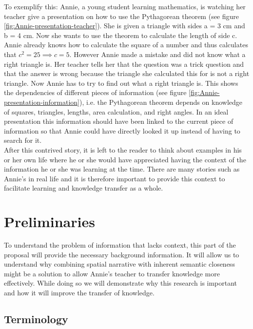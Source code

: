 \documentclass[twoside, 12pt]{article}
\begin{document}
To exemplify this: Annie, a young student learning mathematics, is watching her teacher give a presentation on how to use the Pythagorean theorem (see figure \ref{fig:Annie-presentation-teacher}). She is given a triangle with sides a = 3 cm and b = 4 cm. Now she wants to use the theorem to calculate the length of side c. Annie already knows how to calculate the square of a number and thus calculates that $c^2 = 25 \implies c = 5$. However Annie made a mistake and did not know what a right triangle is. Her teacher tells her that the question was a trick question and that the answer is wrong because the triangle she calculated this for is not a right triangle. Now Annie has to try to find out what a right triangle is. This shows the dependencies of different pieces of information (see figure \ref{fig:Annie-presentation-information}), i.e. the Pythagorean theorem depends on knowledge of squares, triangles, lengths, area calculation, and right angles. In an ideal presentation this information should have been linked to the current piece of information so that Annie could have directly looked it up instead of having to search for it.\\

After this contrived story, it is left to the reader to think about examples in his or her own life where he or she would have appreciated having the context of the information he or she was learning at the time. There are many stories such as Annie's in real life and it is therefore important to provide this context to facilitate learning and knowledge transfer as a whole. \\

\section{Preliminaries}
\label{sec:preliminaries}

To understand the problem of information that lacks context, this part of the proposal will provide the necessary background information. It will allow us to understand why combining spatial narrative with inherent semantic closeness might be a solution to allow Annie's teacher to transfer knowledge more effectively. While doing so we will demonstrate why this research is important and how it will improve the transfer of knowledge.\\

\subsection{Terminology}
\label{sec:terminology}
\end{document}
